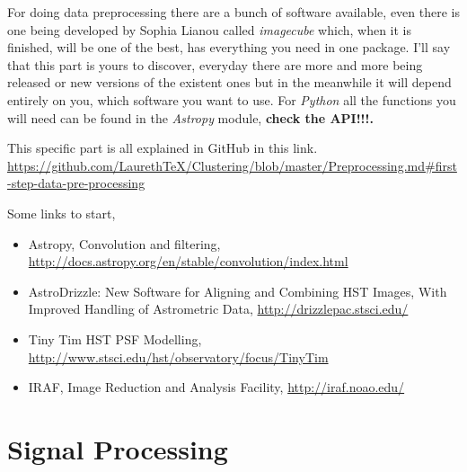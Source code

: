\documentclass[11pt,fleqn]{book} %
\begin{document}
For doing data preprocessing there are a bunch of software available, even there is one being developed by Sophia Lianou called \emph{imagecube} which, when it is finished, will be one of the best, has everything you need in one package. I'll say that this part is yours to discover, everyday there are more and more being released or new versions of the existent ones but in the meanwhile it will depend entirely on you, which software you want to use. For \emph{Python} all the functions you will need can be found in the \emph{Astropy} module, \textbf{check the API!!!.}


This specific part is all explained in GitHub in this link. \url{https://github.com/LaurethTeX/Clustering/blob/master/Preprocessing.md#first-step-data-pre-processing}

\begin{remark}
	Some links to start,
    \begin{itemize}
    	\item Astropy, Convolution and filtering, \url{http://docs.astropy.org/en/stable/convolution/index.html}
        \item AstroDrizzle: New Software for Aligning and Combining
HST Images, With Improved Handling of Astrometric Data, \url{http://drizzlepac.stsci.edu/}
		\item Tiny Tim HST PSF Modelling, \url{http://www.stsci.edu/hst/observatory/focus/TinyTim}
        \item IRAF, Image Reduction and Analysis Facility, \url{http://iraf.noao.edu/}
    \end{itemize}
\end{remark}




\chapter{Signal Processing}
\end{document}
